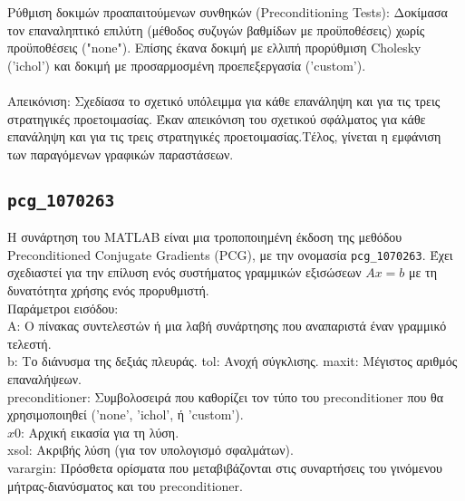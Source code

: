 \documentclass[12pt,a4paper]{article}
\begin{document}
Ρύθμιση δοκιμών προαπαιτούμενων συνθηκών (Preconditioning Tests):
Δοκίμασα τον επαναληπτικό επιλύτη (μέθοδος συζυγών βαθμίδων με προϋποθέσεις) χωρίς προϋποθέσεις ("none"). Επίσης έκανα δοκιμή με ελλιπή προρύθμιση  Cholesky ('ichol') και δοκιμή με προσαρμοσμένη προεπεξεργασία ('custom').\\
\\
Απεικόνιση:
Σχεδίασα το σχετικό υπόλειμμα για κάθε επανάληψη και για τις τρεις στρατηγικές προετοιμασίας. Έκαν απεικόνιση του σχετικού σφάλματος για κάθε επανάληψη και για τις τρεις στρατηγικές προετοιμασίας.Τέλος, γίνεται η εμφάνιση των παραγόμενων γραφικών παραστάσεων.

\subsection{\texttt{pcg\_1070263}}
Η συνάρτηση του MATLAB είναι μια τροποποιημένη έκδοση της μεθόδου Preconditioned Conjugate Gradients (PCG), με την ονομασία \texttt{pcg\_1070263}. Έχει σχεδιαστεί για την επίλυση ενός συστήματος γραμμικών εξισώσεων $Ax=b$ με τη δυνατότητα χρήσης ενός προρυθμιστή.\\

Παράμετροι εισόδου:\\
A: Ο πίνακας συντελεστών ή μια λαβή συνάρτησης που αναπαριστά έναν γραμμικό τελεστή.\\
b: Το διάνυσμα της δεξιάς πλευράς.
tol: Ανοχή σύγκλισης.
maxit: Μέγιστος αριθμός επαναλήψεων.\\
preconditioner: Συμβολοσειρά που καθορίζει τον τύπο του preconditioner που θα χρησιμοποιηθεί
('none', 'ichol', ή 'custom').\\
$x0$: Αρχική εικασία για τη λύση.\\
xsol: Ακριβής λύση (για τον υπολογισμό σφαλμάτων).\\
varargin: Πρόσθετα ορίσματα που μεταβιβάζονται στις συναρτήσεις του γινόμενου μήτρας-διανύσματος και του preconditioner.\\
\end{document}
